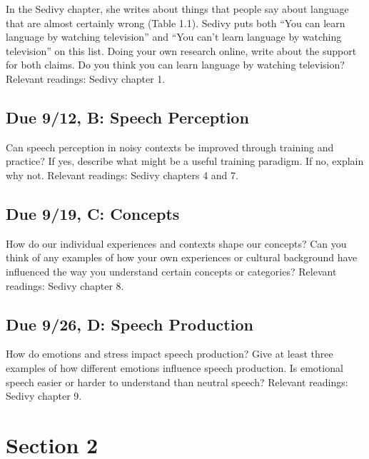 \documentclass[
  letterpaper,
  DIV=11,
  numbers=noendperiod]{scrreprt}
\begin{document}
In the Sedivy chapter, she writes about things that people say about
language that are almost certainly wrong (Table 1.1). Sedivy puts both
``You can learn language by watching television'' and ``You can't learn
language by watching television'' on this list. Doing your own research
online, write about the support for both claims. Do you think you can
learn language by watching television? Relevant readings: Sedivy chapter
1.

\hypertarget{due-912-b-speech-perception}{%
\subsection*{Due 9/12, B: Speech
Perception}\label{due-912-b-speech-perception}}

Can speech perception in noisy contexts be improved through training and
practice? If yes, describe what might be a useful training paradigm. If
no, explain why not. Relevant readings: Sedivy chapters 4 and 7.

\hypertarget{due-919-c-concepts}{%
\subsection*{Due 9/19, C: Concepts}\label{due-919-c-concepts}}

How do our individual experiences and contexts shape our concepts? Can
you think of any examples of how your own experiences or cultural
background have influenced the way you understand certain concepts or
categories? Relevant readings: Sedivy chapter 8.

\hypertarget{due-926-d-speech-production}{%
\subsection*{Due 9/26, D: Speech
Production}\label{due-926-d-speech-production}}

How do emotions and stress impact speech production? Give at least three
examples of how different emotions influence speech production. Is
emotional speech easier or harder to understand than neutral speech?
Relevant readings: Sedivy chapter 9.

\hypertarget{section-2}{%
\section*{\texorpdfstring{{Section 2}}{Section 2}}\label{section-2}}
\end{document}
